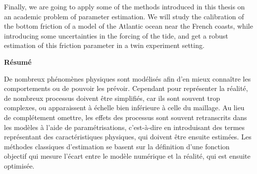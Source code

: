 Finally, we are going to apply some of the methods introduced in this
thesis on an academic problem of parameter estimation. We will study
the calibration of the bottom friction of a model of the Atlantic
ocean near the French coasts, while introducing some uncertainties in
the forcing of the tide, and get a robust estimation of this friction
parameter in a twin experiment setting.



%
%
%

\vspace{0.5cm}
\vfill
\etoile
\vfill
\vspace{0.5cm}
\begin{center}
\small  \bf Résumé
\end{center}
\vspace{0.3cm} 

De nombreux phénomènes physiques sont modélisés afin d'en mieux
connaître les comportements ou de pouvoir les prévoir. Cependant pour
représenter la réalité, de nombreux processus doivent être simplifiés,
car ils sont souvent trop complexes, ou apparaissent à échelle bien
inférieure à celle du maillage. Au lieu de complétement omettre, les
effets des processus sont souvent retranscrits dans les modèles à
l'aide de paramétrisations, c'est-à-dire en introduisant des termes
représentant des caractéristiques physiques, qui doivent être ensuite
estimées. Les méthodes classiques d'estimation se basent sur la
définition d'une fonction objectif qui mesure l'écart entre le modèle
numérique et la réalité, qui est ensuite optimisée.

